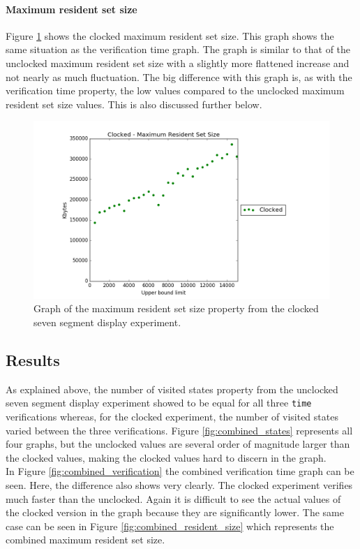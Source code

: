 \paragraph{Maximum resident set size}
Figure \ref{fig:clocked_resident_size} shows the clocked maximum resident set size. This graph shows the same situation as the verification time graph. The graph is similar to that of the unclocked maximum resident set size with a slightly more flattened increase and not nearly as much fluctuation. The big difference with this graph is, as with the verification time property, the low values compared to the unclocked maximum resident set size values. This is also discussed further below.
\begin{figure}
    \centering
    \includegraphics[scale=0.6]{./figures/plots/clocked_size.png}
\caption{Graph of the maximum resident set size property from the clocked seven segment display experiment.}
\label{fig:clocked_resident_size}
\end{figure}
\subsection{Results}
As explained above, the number of visited states property from the unclocked seven segment display experiment showed to be equal for all three \texttt{time} verifications whereas, for the clocked experiment, the number of visited states varied between the three verifications. Figure \ref{fig:combined_states} represents all four graphs, but the unclocked values are several order of magnitude larger than the clocked values, making the clocked values hard to discern in the graph.\\

In Figure \ref{fig:combined_verification} the combined verification time graph can be seen. Here, the difference also shows very clearly. The clocked experiment verifies much faster than the unclocked. Again it is difficult to see the actual values of the clocked version in the graph because they are significantly lower. The same case can be seen in Figure \ref{fig:combined_resident_size} which represents the combined maximum resident set size. \\

